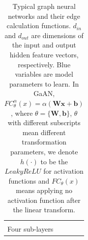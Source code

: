 \begin{table}
\begin{footnotesize}
\begin{tabular}{ccp{8em}p{22em}r}
\begin{scriptsize}
			\end{scriptsize}                                                                                            &
			\makecell[r]{$O(max(d_a, d_m, d_v) * K * d_{in})$ \\
                        Four sub-layers}\\
			\bottomrule
		\end{tabular}
	\end{footnotesize}
	\caption{Typical graph neural networks and their edge calculation functions.
		$d_{in}$ and $d_{out}$ are dimensions of the input and output hidden feature vectors, respectively.
		Blue variables are model parameters to learn. In GaAN, $FC^{\alpha}_{\theta}(x) = \alpha(\boldsymbol{W}\boldsymbol{x} + \boldsymbol{b})$, 
		where $\theta=\{\boldsymbol{W}, \boldsymbol{b}\}$, $\theta$ with different subscripts mean different transformation parameters, we denote $h(\cdot)$
		to be the $LeakyReLU$ for activation functions and $FC_{\theta}(x)$ means applying no activation function after the linear transform.
	}
	\label{tab:gnn_overview_edge}
\end{table}


